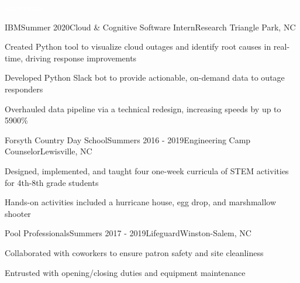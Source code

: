 \documentclass{resume}
\begin{document}
\begin{rSection}{\colorbox{NCSURED}{\textcolor{WHITE}{Experience}}}
	\begin{rSubsection}{IBM}{Summer 2020}{Cloud \& Cognitive Software Intern}{Research Triangle Park, NC}
		\item Created Python tool to visualize cloud outages and identify root causes in real-time, driving response improvements
		\item Developed Python Slack bot to provide actionable, on-demand data to outage responders
		\item Overhauled data pipeline via a technical redesign, increasing speeds by up to 5900\%
	\end{rSubsection}

	\begin{rSubsection}{Forsyth Country Day School}{Summers 2016 - 2019}{Engineering Camp Counselor}{Lewisville, NC}
		\item Designed, implemented, and taught four one-week curricula of STEM activities for 4th-8th grade students
		\item Hands-on activities included a hurricane house, egg drop, and marshmallow shooter
	\end{rSubsection}

	\begin{rSubsection}{Pool Professionals}{Summers 2017 - 2019}{Lifeguard}{Winston-Salem, NC}
		\item Collaborated with coworkers to ensure patron safety and site cleanliness
		\item Entrusted with opening/closing duties and equipment maintenance  
	\end{rSubsection}	
\end{rSection}
\end{document}
